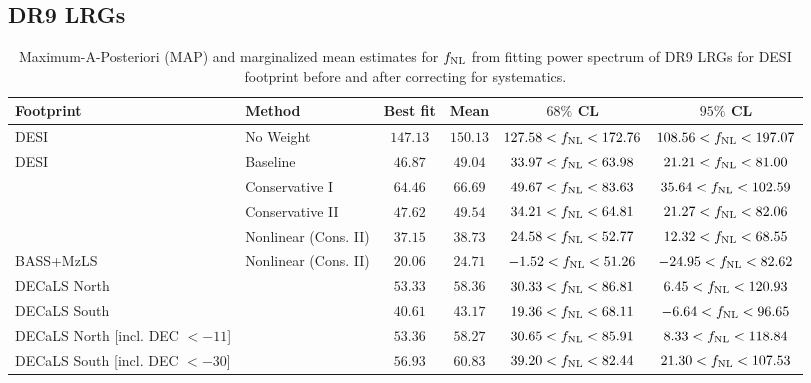 \subsection{DR9 LRGs}
\begin{table}
  \begin{center}
    \caption{Maximum-A-Posteriori (MAP) and marginalized mean estimates for $f_{\rm NL}$ from fitting power spectrum of DR9 LRGs for DESI footprint before and after correcting for systematics.}
    \label{tab:dr9method}
    \begin{tabular}{llcccc}
    \hline
    \hline
Footprint   & Method & 	Best fit  & Mean & $ 68\%$ CL & $ 95\%$ CL \\
    \hline
DESI & No Weight                               & $147.13$& $150.13$& $127.58<f_{\rm NL}<172.76$& $108.56<f_{\rm NL}<197.07$\\
\hline
DESI &Baseline                                & $ 46.87$& $ 49.04$& $ 33.97<f_{\rm NL}< 63.98$& $ 21.21<f_{\rm NL}< 81.00$\\
&Conservative I                          & $ 64.46$& $ 66.69$& $ 49.67<f_{\rm NL}< 83.63$& $ 35.64<f_{\rm NL}<102.59$\\
&Conservative II                         & $ 47.62$& $ 49.54$& $ 34.21<f_{\rm NL}< 64.81$& $ 21.27<f_{\rm NL}< 82.06$\\
&Nonlinear (Cons. II)                    & $ 37.15$& $ 38.73$& $ 24.58<f_{\rm NL}< 52.77$& $ 12.32<f_{\rm NL}< 68.55$\\
\hline
BASS+MzLS & Nonlinear (Cons. II)    & $ 20.06$& $ 24.71$& $ -1.52<f_{\rm NL}< 51.26$& $-24.95<f_{\rm NL}< 82.62$\\
DECaLS North &            & $ 53.33$& $ 58.36$& $ 30.33<f_{\rm NL}< 86.81$& $  6.45<f_{\rm NL}<120.93$\\
DECaLS South &          & $ 40.61$& $ 43.17$& $ 19.36<f_{\rm NL}< 68.11$& $ -6.64<f_{\rm NL}< 96.65$\\
DECaLS North [incl. DEC $<-11$]   &             & $ 53.36$& $ 58.27$& $ 30.65<f_{\rm NL}< 85.91$& $  8.33<f_{\rm NL}<118.84$\\
DECaLS South [incl. DEC $< -30$]    &            & $ 56.93$& $ 60.83$& $ 39.20<f_{\rm NL}< 82.44$& $ 21.30<f_{\rm NL}<107.53$\\
    \end{tabular}
  \end{center}
\end{table}


